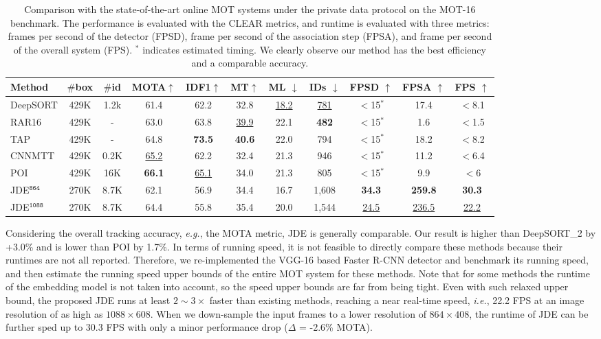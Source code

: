 \documentclass[runningheads]{llncs}
\def\ie{\textit{i.e.}}
\begin{document}
\begin{table}[t]
\centering
    \begin{tabular}{l|cc|cccccccc}
    
    \toprule
         Method & $\#$box & $\#$id &MOTA$\uparrow$ &IDF1$\uparrow$	&MT$\uparrow$ &ML $\downarrow$ &IDs $\downarrow$ &FPSD $\uparrow$&	FPSA $\uparrow$&FPS $\uparrow$ \\
         
    \midrule
         DeepSORT &	429K&	1.2k& 61.4&	62.2&	32.8&	\underline{18.2}&	\underline{781}&$<$15$^*$	&17.4&	$<$8.1 \\
         RAR16&429K&	-&	63.0&	63.8&	\underline{39.9}&	22.1&	\textbf{482}	&$<$15$^*$&	1.6	&$<$1.5 \\
         TAP&429K&	- &	64.8&	\textbf{73.5}&	\textbf{40.6}&	22.0& 	794	&$<$15$^*$ &	18.2 &	$<$8.2 \\
         CNNMTT	&	429K&	0.2K&	\underline{65.2}&	62.2&	32.4&	21.3&	946&	$<$15$^*$&	11.2&	$<$6.4 \\
         POI&	429K&	16K&	\textbf{66.1}&	\underline{65.1}&	34.0&	21.3&805&	$<$15$^*$	&9.9&	$<$6 \\
         
    \midrule
        JDE$^\texttt{864}$ &	270K&	8.7K& 62.1&	56.9&	34.4&	16.7&1,608	&\textbf{34.3}&	\textbf{259.8}&	\textbf{30.3}	 \\
        JDE$^\texttt{1088}$&	270K&	8.7K& 64.4&	55.8&	35.4&	20.0&1,544	&\underline{24.5}&	\underline{236.5}&	\underline{22.2}	 \\
    \bottomrule
    \end{tabular}
    \caption{Comparison with the state-of-the-art online MOT systems under the private data protocol on the MOT-16 benchmark. The performance is evaluated with the CLEAR metrics, and runtime is evaluated with three metrics: frames per second of the detector (FPSD), frame per second of the association step (FPSA), and frame per second of the overall system (FPS). $^*$ indicates estimated timing. We clearly observe our method has the best efficiency and a comparable accuracy.} \label{tab:sota}
    
\end{table}
Considering the overall tracking accuracy, \emph{e.g.}, the MOTA metric, JDE is generally comparable. Our result is higher than DeepSORT\_2 by +3.0\% and is lower than POI by 1.7\%. In terms of running speed, it is not feasible to directly compare these methods because their runtimes are not all reported. Therefore, we re-implemented the VGG-16 based Faster R-CNN detector and benchmark its running speed, and then estimate the running speed upper bounds of the entire MOT system for these methods. Note that for some methods the runtime of the embedding model is not taken into account, so the speed upper bounds are far from being tight. Even with such relaxed upper bound, the proposed JDE runs at least $2\sim3\times$ faster than existing methods, reaching a near real-time speed, \ie, 22.2 FPS at an image resolution of as high as $1088\times608$. When we down-sample the input frames to a lower resolution of $864\times408$, the runtime of JDE can be further sped up to 30.3 FPS with only a minor performance drop ($\Delta$ = -2.6\% MOTA).
\end{document}
